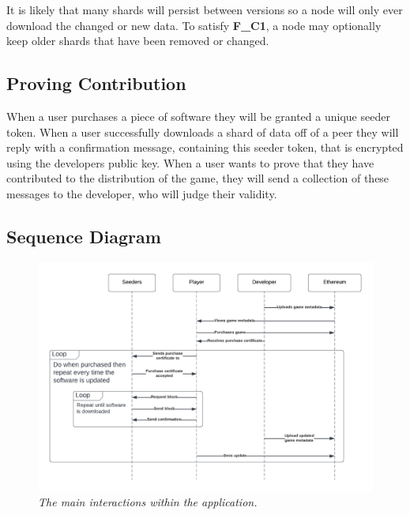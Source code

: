 \noindent It is likely that many shards will persist between versions so a node will only ever download the changed or new data. To satisfy \textbf{F\_C1}, a node may optionally keep older shards that have been removed or changed.


\subsection*{Proving Contribution}

When a user purchases a piece of software they will be granted a unique seeder token. When a user successfully downloads a shard of data off of a peer they will reply with a confirmation message, containing this seeder token, that is encrypted using the developers public key. When a user wants to prove that they have contributed to the distribution of the game, they will send a collection of these messages to the developer, who will judge their validity.

\subsection*{Sequence Diagram}

\begin{figure}[ht]
  \centering
  \includegraphics[width=.95\textwidth]{images/diagrams/seqeunce-diagram.png}
  \caption{\textit{The main interactions within the application.}}
\end{figure}